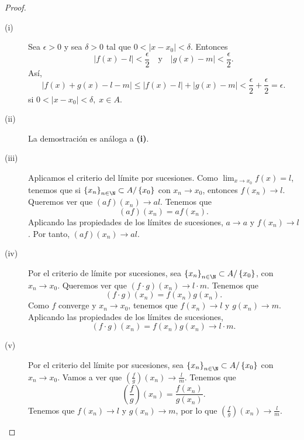 \begin{proof}
\begin{description}
\item[(i)] Sea $\displaystyle \epsilon > 0 $ y sea $\displaystyle \delta > 0 $ tal que $\displaystyle 0 < \left|x -x_{0}\right| < \delta  $. Entonces 
	\[ \left|f\left(x\right)-l\right| < \frac{\epsilon }{2} \quad \text{y} \quad \left|g\left(x\right)-m\right| < \frac{\epsilon }{2} .\]
	Así, 
	\[ \left|f\left(x\right)+g\left(x\right) -l-m\right| \leq \left|f\left(x\right)-l\right| + \left|g\left(x\right)-m\right| < \frac{\epsilon }{2} + \frac{\epsilon }{2} = \epsilon  .\]
si $\displaystyle 0 < \left|x - x_{0}\right| < \delta , \; x \in A $.
\item[(ii)] La demostración es análoga a \textbf{(i)}.
\item[(iii)] Aplicamos el criterio del límite por sucesiones. Como $\displaystyle \lim_{x \to x_{0}}f\left(x\right)=l $, tenemos que si $\displaystyle \left\{ x_{n}\right\} _{n\in\N}\subset A/ \left\{ x_{0}\right\}  $ con $\displaystyle x_{n} \to x_{0}$, entonces $\displaystyle f\left(x_{n}\right) \to l $. Queremos ver que $\displaystyle \left(af\right)\left(x_{n}\right) \to al $. Tenemos que
	\[\left(af\right)\left(x_{n}\right) = a f\left(x_{n}\right)  .\]
Aplicando las propiedades de los límites de sucesiones, $\displaystyle a \to a $ y $\displaystyle f\left(x_{n}\right) \to l $. Por tanto, $\displaystyle \left(af\right)\left(x_{n}\right) \to al $.
\item[(iv)] Por el criterio de límite por sucesiones, sea $\displaystyle \left\{ x_{n}\right\} _{n\in\N}\subset A/ \left\{ x_{0}\right\}  $, con $\displaystyle x_{n} \to x_{0} $. Queremos ver que $\displaystyle \left(f \cdot g\right)\left(x_{n}\right) \to l \cdot m $. Tenemos que
	\[\left(f \cdot g\right)\left(x_{n}\right) = f\left(x_{n}\right)g\left(x_{n}\right) .\]
Como $\displaystyle f $ converge y $\displaystyle x_{n} \to x_{0} $, tenemos que $\displaystyle f\left(x_{n}\right) \to l $ y $\displaystyle g\left(x_{n}\right)\to m $. Aplicando las propiedades de los límites de sucesiones, 
\[\left(f \cdot g\right)\left(x_{n}\right) = f\left(x_{n}\right)g\left(x_{n}\right) \to l \cdot m .\]
\item[(v)] Por el criterio del límite por sucesiones, sea $\displaystyle \left\{ x_{n}\right\} _{n\in\N}\subset A/ \left\{ x_{0}\right\}  $ con $\displaystyle x_{n} \to x_{0} $. Vamos a ver que $\displaystyle \left(\frac{f}{g}\right)\left(x_{n}\right) \to \frac{l}{m} $. Tenemos que
	\[\left(\frac{f}{g}\right)\left(x_{n}\right) = \frac{f\left(x_{n}\right)}{g\left(x_{n}\right)} .\]
Tenemos que $\displaystyle f\left(x_{n}\right) \to l $ y $\displaystyle g\left(x_{n}\right)\to m $, por lo que $\displaystyle \left(\frac{f}{g}\right)\left(x_{n}\right) \to \frac{l}{m} $.
\end{description}
\end{proof}

